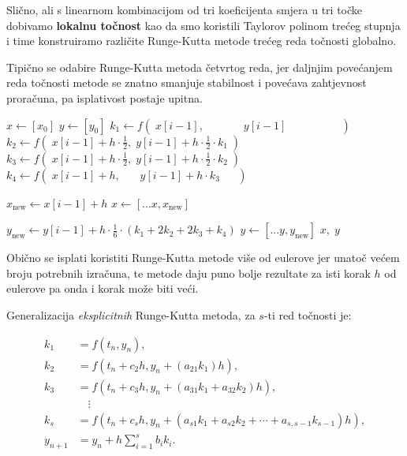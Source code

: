 Slično, ali s linearnom kombinacijom od tri koeficijenta smjera u tri točke
dobivamo \textbf{lokalnu točnost} kao da smo koristili Taylorov polinom trećeg
stupnja i time konstruiramo različite Runge-Kutta metode trećeg reda točnosti
globalno.

Tipično se odabire Runge-Kutta metoda četvrtog reda, jer daljnjim povećanjem
reda točnosti metode se znatno smanjuje stabilnost i povećava zahtjevnost
proračuna, pa isplativost postaje upitna.

\begin{algorithmic}
    \State $x \gets [x_0]$
    \State $y \gets [y_0]$
        \State $k_1 \gets f(\;x[i-1], \phantom{\ \,+ h \cdot \frac{1}{2}} \;y[i-1] \phantom{\ + h \cdot \frac{1}{2}\cdot k_1}\;)$
        \State $k_2 \gets f(\;x[i-1] + h \cdot \frac{1}{2},               \;y[i-1] + h \cdot \frac{1}{2}\cdot k_1\;)$
        \State $k_3 \gets f(\;x[i-1] + h \cdot \frac{1}{2},               \;y[i-1] + h \cdot \frac{1}{2}\cdot k_2\;)$
        \State $k_4 \gets f(\;x[i-1] + h, \phantom{\ \,\cdot \frac{1}{2}} \;y[i-1] + h \cdot k_3 \phantom{\ \frac{1}{2}\cdot}\;)$
        
        \State $x_{\text{new}} \gets x[i-1] + h$
        \State $x \gets [...x, x_{\text{new}}]$
        
        \State $y_{\text{new}} \gets y[i-1] + h \cdot \frac{1}{6} \cdot (k_1 + 2k_2 + 2k_3 + k_4)$
        \State $y \gets [...y, y_{\text{new}}]$
    \EndFor
    \State \Return $x,\;y$
\EndFunction
\end{algorithmic}

Obično se isplati koristiti Runge-Kutta metode više od eulerove jer unatoč većem
broju potrebnih izračuna, te metode daju puno bolje rezultate za isti korak $h$
od eulerove pa onda i korak može biti veći.

Generalizacija \textit{eksplicitnih} Runge-Kutta metoda, za $s$-ti red točnosti je:

\begin{align*}
    k_1 & = f(t_n, y_n),\\
    k_2 & = f(t_n+c_2h, y_n+(a_{21}k_1)h),\\
    k_3 & = f(t_n+c_3h, y_n+(a_{31}k_1+a_{32}k_2)h),\\
        &\quad \vdots\\
    k_s & = f(t_n+c_sh, y_n+(a_{s1}k_1+a_{s2}k_2+\cdots+a_{s,s-1}k_{s-1})h),\\
    y_{n+1} &= y_n + h \sum_{i=1}^s b_i k_i.
\end{align*}

